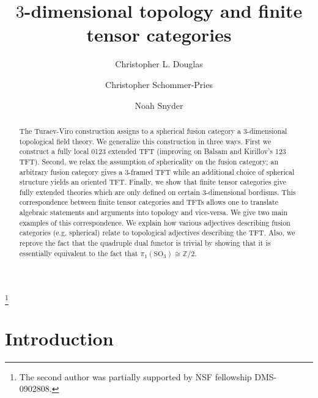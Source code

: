 \documentclass{amsart}
\begin{document}
\title{$3$-dimensional topology and finite tensor categories}

\begin{abstract}
The Turaev-Viro construction assigns to a spherical fusion category a 3-dimensional topological field theory.  We generalize this construction in three ways. First we construct a fully local 0123 extended TFT (improving on Balsam and Kirillov's 123 TFT).  Second, we relax the assumption of sphericality on the fusion category; an arbitrary fusion category gives a $3$-framed TFT while an additional choice of spherical structure yields an oriented TFT.  Finally, we show that finite tensor categories give fully extended theories which are only defined on certain $3$-dimensional bordisms.  This correspondence between finite tensor categories and TFTs allows one to translate algebraic statements and arguments into topology and vice-versa.  We give two main examples of this correspondence.  We explain how various adjectives describing fusion categories (e.g. spherical) relate to topological adjectives describing the TFT.  Also, we reprove the fact that the quadruple dual functor is trivial by showing that it is essentially equivalent to the fact that $\pi_1(\mathrm{SO}_3) \cong \mathbb{Z}/2$.
\end{abstract}
	
\author{Christopher L. Douglas}
\address{Department of Mathematics, University of California, Berkeley, CA 94720, USA}
	
\author{Christopher Schommer-Pries}
\address{
} %

\author{Noah Snyder}
\address{}

\thanks{The second author was partially supported by NSF fellowship DMS-0902808.}


\maketitle	
\setcounter{tocdepth}{3}
\tableofcontents

\section{Introduction}
\end{document}
